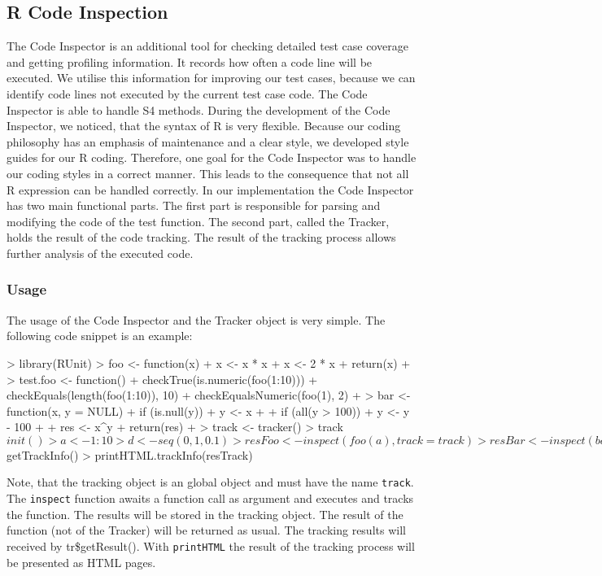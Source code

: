 \documentclass[12pt, a4paper]{article}
\begin{document}
\subsection{R Code Inspection}
\label{subsection:RCodeInspection}
The Code Inspector is an additional tool for checking detailed test case coverage and getting profiling information.
It records how often a code line will be executed. We utilise this information for improving our test cases, because we can identify code lines not executed by the current test case code.
The Code Inspector is able to handle S4 methods.
During the development of the Code Inspector, we noticed, that the syntax of R is very flexible.
Because our coding philosophy has an emphasis of maintenance and a clear style, we developed style guides for our R coding.
Therefore, one goal for the Code Inspector was to handle our coding styles in a correct manner.
This leads to the consequence that not all R expression can be handled correctly.
In our implementation the Code Inspector has two main functional parts.
The first part is responsible for parsing and modifying the code of the test function.
The second part, called the Tracker, holds the result of the code tracking.
The result of the tracking process allows further analysis of the executed code.

\subsubsection{Usage}
The usage of the Code Inspector and the Tracker object is very simple. The following code snippet is an example:
\begin{Schunk}
\begin{Sinput}
> library(RUnit)
> foo <- function(x) {
+     x <- x * x
+     x <- 2 * x
+     return(x)
+ }
> test.foo <- function() {
+     checkTrue(is.numeric(foo(1:10)))
+     checkEquals(length(foo(1:10)), 10)
+     checkEqualsNumeric(foo(1), 2)
+ }
> bar <- function(x, y = NULL) {
+     if (is.null(y)) {
+         y <- x
+     }
+     if (all(y > 100)) {
+         y <- y - 100
+     }
+     res <- x^y
+     return(res)
+ }
> track <- tracker()
> track$init()
> a <- 1:10
> d <- seq(0, 1, 0.1)
> resFoo <- inspect(foo(a), track = track)
> resBar <- inspect(bar(d), track = track)
> resTrack <- track$getTrackInfo()
> printHTML.trackInfo(resTrack)
\end{Sinput}
\end{Schunk}

Note, that the tracking object is an global object and must have the name {\tt track}.
The {\tt inspect} function awaits a function call as argument and executes and tracks the function.
The results will be stored in the tracking object.
The result of the function (not of the Tracker) will be returned as usual.
The tracking results will received by tr\$getResult().
With {\tt printHTML} the result of the tracking process will be presented as HTML pages.
\end{document}
